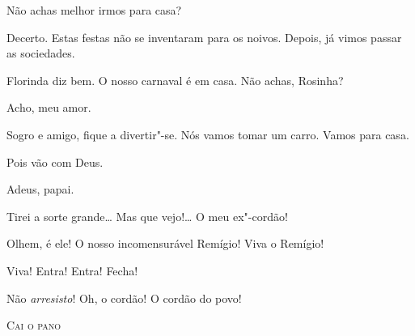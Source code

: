 







  Não achas melhor irmos para casa?

 Decerto. Estas festas não se inventaram para os noivos.
Depois, já vimos passar as sociedades.

 Florinda diz bem. O nosso carnaval é em casa. Não achas,
Rosinha?

 Acho, meu amor.

 Sogro e amigo, fique a divertir"-se. Nós vamos tomar um carro.
Vamos para casa.

 Pois vão com Deus.  

 Adeus, papai.




 Tirei a sorte grande\ldots{} Mas que vejo!\ldots{} O meu ex"-cordão!

 Olhem, é ele! O nosso incomensurável Remígio! Viva o
Remígio! 

 Viva! Entra! Entra! Fecha!  

 Não \textit{arresisto}! Oh, o cordão! O cordão do povo!



\bigskip

\begin{center}
\textsc{Cai o pano}
\end{center}


